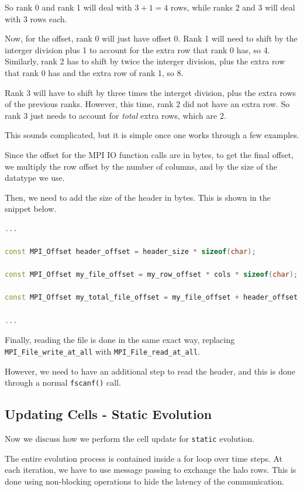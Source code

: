 \documentclass{report}
\begin{document}
So rank 0 and rank 1 will deal with $3+1=4$ rows, while ranks 2 and 3 will deal with $3$ rows each.

Now, for the offset, rank 0 will just have offset 0. Rank 1 will need to shift 
by the interger division plus 1 to account for the extra row that rank 0 has, so 4. 
Similarly, rank 2 has to shift by twice the interger division, plus the extra 
row that rank 0 has and the extra row of rank 1, so 8. 

Rank 3 will have to shift by three times the interget division, plus the extra 
rows of the previous ranks. However, this time, rank 2 did not have an extra 
row. So rank 3 just needs to account for \textit{total} extra rows, which are 2.

This sounds complicated, but it is simple once one works through a few examples.

Since the offset for the MPI IO function calls are in bytes, to get the final 
offset, we multiply the row offset by the number of columns, and by the 
size of the datatype we use.

Then, we need to add the size of the header in bytes. This is shown in the snippet below.

\begin{lstlisting}[language=C++]
...

const MPI_Offset header_offset = header_size * sizeof(char);

const MPI_Offset my_file_offset = my_row_offset * cols * sizeof(char);

const MPI_Offset my_total_file_offset = my_file_offset + header_offset;

...
\end{lstlisting}

Finally, reading the file is done in the same exact way, replacing 
\texttt{MPI\_File\_write\_at\_all} with \texttt{MPI\_File\_read\_at\_all}. 

However, we need to have an additional step to read the header, and this is done 
through a normal \texttt{fscanf()} call.

\subsection{Updating Cells - Static Evolution}

Now we discuss how we perform the cell update for \texttt{static} evolution. 

The entire evolution process is contained inside a for loop over time steps. 
At each iteration, we have to use message passing to exchange the halo rows. 
This is done using non-blocking operations to hide the latency of the communication.
\end{document}
